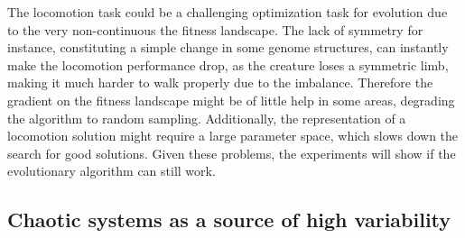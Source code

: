 \documentclass[main]{subfiles}
\begin{document}
The locomotion task could be a challenging optimization task for evolution due to the very non-continuous the fitness landscape. %
%
The lack of symmetry for instance, constituting a simple change in some genome structures, can instantly make the locomotion performance drop, as the creature loses a symmetric limb, making it much harder to walk properly due to the imbalance. %
%
Therefore the gradient on the fitness landscape might be of little help in some areas, degrading the algorithm to random sampling. %
%
Additionally, the representation of a locomotion solution might require a large parameter space, which slows down the search for good solutions. Given these problems, the experiments will show if the evolutionary algorithm can still work.

\subsection{Chaotic systems as a source of high variability}
\end{document}
